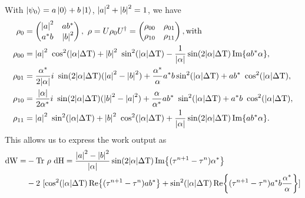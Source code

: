 With $\ket{\psi_0} = a \ket{0} + b \ket{1}$,  $\abs{a}^2 + \abs{b}^2 = 1$, we  have
\begin{align}
	\rho_0 & = \begin{pmatrix}
	\abs{a}^2 & a b ^* \\
	a^* b & \abs{b}^2 \\
	\end{pmatrix}, \ \rho = U \rho_0 U^\dagger = 
	\begin{pmatrix}
	\rho_{00} & \rho_{01} \\
	\rho_{10} & \rho_{11} \\
	\end{pmatrix}, \text{with} \nonumber \\
	\rho_{00} & = \abs{a}^2 \ \cos^2(\abs{\alpha} \Delta \mathrm{T}) + \abs{b}^2 \ \sin^2(\abs{\alpha} \Delta \mathrm{T}) - \frac{1}{\abs{\alpha}} \sin(2 \abs{\alpha} \Delta \mathrm{T}) \Im{a b^* \alpha}, \nonumber \\
	\rho_{01} & = \frac{\alpha^*}{2 \abs{\alpha}} i \ \sin(2 \abs{\alpha} \Delta \mathrm{T}) (\abs{a}^2 - \abs{b}^2) + \frac{\alpha^*}{\alpha} a^* b \sin^2(\abs{\alpha} \Delta \mathrm{T}) + a b^* \ \cos^2(\abs{\alpha} \Delta \mathrm{T}), \nonumber \\
	\rho_{10} & = 	\frac{\abs{\alpha}}{2 \alpha^*} i \ \sin(2 \abs{\alpha} \Delta \mathrm{T}) (\abs{b}^2 - \abs{a}^2) + \frac{\alpha}{\alpha^*} a b^* \ \sin^2(\abs{\alpha} \Delta \mathrm{T}) + a^* b \ \cos^2(\abs{\alpha} \Delta \mathrm{T}), \nonumber \\
	\rho_{11} & = \abs{a}^2 \ \sin^2(\abs{\alpha} \Delta \mathrm{T}) + \abs{b}^2 \ \cos^2(\abs{\alpha} \Delta \mathrm{T}) + \frac{1}{\abs{\alpha}} \sin(2 \abs{\alpha} \Delta \mathrm{T}) \Im{a b^* \alpha}. \nonumber
\end{align}
	This allows us to express the work output as
\begin{align}
	\mathrm{dW} = & - \mathrm{Tr} \ \rho \ \mathrm{dH} = \frac{\abs{a}^2 - \abs{b}^2}{\abs{\alpha}} \sin(2 \abs{\alpha} \Delta \mathrm{T}) \Im{(\tau^{n+1} - \tau^n) \alpha^*} \nonumber \\
	& - 2 \ [\cos^2(\abs{\alpha} \Delta \mathrm{T}) \Re{(\tau^{n+1} - \tau^n) a b^*} 
	+ \sin^2(\abs{\alpha} \Delta \mathrm{T}) \Re{(\tau^{n+1} - \tau^n)a^* b \frac{\alpha^*}{\alpha}} ] \label{dwformula}
\end{align}